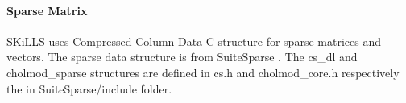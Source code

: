 \documentclass[english,11pt]{article}
\begin{document}
\paragraph{Sparse Matrix}
SKiLLS uses Compressed Column Data C structure for sparse matrices and vectors. The sparse data structure is from SuiteSparse \cite{10.1145/2049662.2049670}. The cs_dl and cholmod_sparse structures are defined in cs.h and cholmod_core.h respectively the in SuiteSparse/include folder. 















\end{document}

